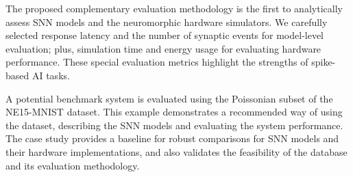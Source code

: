 The proposed complementary evaluation methodology is the first to analytically assess SNN models and the neuromorphic hardware simulators.
We carefully selected response latency and the number of synaptic events for model-level evaluation; plus, simulation time and energy usage for evaluating hardware performance.
These special evaluation metrics highlight the strengths of spike-based AI tasks.

A potential benchmark system is evaluated using the Poissonian subset of the NE15-MNIST dataset.
This example demonstrates a recommended way of using the dataset, describing the SNN models and evaluating the system performance.
The case study provides a baseline for robust comparisons for SNN models and their hardware implementations, and also  validates the feasibility of the database and its evaluation methodology.



